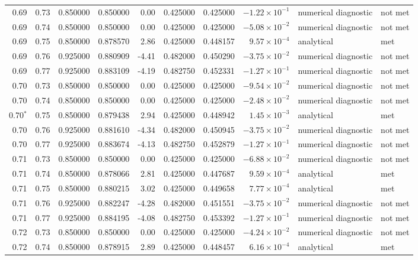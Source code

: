 \begin{landscape}
\begin{longtable}{@{\extracolsep{\fill}}rrrrrrrrll@{}}
0.69 & 0.73 & 0.850000 & 0.850000 & 0.00 & 0.425000 & 0.425000 & $-1.22\times10^{-1}$ & numerical diagnostic & not met \\
0.69 & 0.74 & 0.850000 & 0.850000 & 0.00 & 0.425000 & 0.425000 & $-5.08\times10^{-2}$ & numerical diagnostic & not met \\
0.69 & 0.75 & 0.850000 & 0.878570 & 2.86 & 0.425000 & 0.448157 & $9.57\times10^{-4}$ & analytical & met \\
0.69 & 0.76 & 0.925000 & 0.880909 & -4.41 & 0.482000 & 0.450290 & $-3.75\times10^{-2}$ & numerical diagnostic & not met \\
0.69 & 0.77 & 0.925000 & 0.883109 & -4.19 & 0.482750 & 0.452331 & $-1.27\times10^{-1}$ & numerical diagnostic & not met \\
0.70 & 0.73 & 0.850000 & 0.850000 & 0.00 & 0.425000 & 0.425000 & $-9.54\times10^{-2}$ & numerical diagnostic & not met \\
0.70 & 0.74 & 0.850000 & 0.850000 & 0.00 & 0.425000 & 0.425000 & $-2.48\times10^{-2}$ & numerical diagnostic & not met \\
0.70$^{*}$ & 0.75 & 0.850000 & 0.879438 & 2.94 & 0.425000 & 0.448942 & $1.45\times10^{-3}$ & analytical & met \\
0.70 & 0.76 & 0.925000 & 0.881610 & -4.34 & 0.482000 & 0.450945 & $-3.75\times10^{-2}$ & numerical diagnostic & not met \\
0.70 & 0.77 & 0.925000 & 0.883674 & -4.13 & 0.482750 & 0.452879 & $-1.27\times10^{-1}$ & numerical diagnostic & not met \\
0.71 & 0.73 & 0.850000 & 0.850000 & 0.00 & 0.425000 & 0.425000 & $-6.88\times10^{-2}$ & numerical diagnostic & not met \\
0.71 & 0.74 & 0.850000 & 0.878066 & 2.81 & 0.425000 & 0.447687 & $9.59\times10^{-4}$ & analytical & met \\
0.71 & 0.75 & 0.850000 & 0.880215 & 3.02 & 0.425000 & 0.449658 & $7.77\times10^{-4}$ & analytical & met \\
0.71 & 0.76 & 0.925000 & 0.882247 & -4.28 & 0.482000 & 0.451551 & $-3.75\times10^{-2}$ & numerical diagnostic & not met \\
0.71 & 0.77 & 0.925000 & 0.884195 & -4.08 & 0.482750 & 0.453392 & $-1.27\times10^{-1}$ & numerical diagnostic & not met \\
0.72 & 0.73 & 0.850000 & 0.850000 & 0.00 & 0.425000 & 0.425000 & $-4.24\times10^{-2}$ & numerical diagnostic & not met \\
0.72 & 0.74 & 0.850000 & 0.878915 & 2.89 & 0.425000 & 0.448457 & $6.16\times10^{-4}$ & analytical & met \\

\end{longtable}
\end{landscape}
